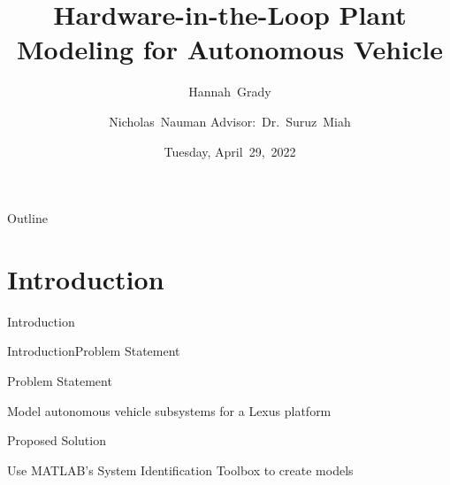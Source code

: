 \documentclass{beamer}
\title[HIL Plant Modeling]{Hardware-in-the-Loop Plant Modeling for Autonomous Vehicle}
\author[H.~Grady, N.~Nauman]{Hannah~Grady \and Nicholas~Nauman 
\linebreak Advisor:~Dr.~Suruz~Miah}
\institute[Bradley University] %
{
  Department of Electrical and Computer Engineering\\
  Bradley University\\
  1501 W. Bradley Avenue\\
  Peoria, IL, 61625, USA
}
\date[April~29,~2022]{Tuesday, April~29,~2022}
\begin{document}
\begin{frame}
  \titlepage
\end{frame}

\begin{frame}{Outline} 
  \tableofcontents%
\end{frame}

\section{Introduction}

\begin{frame}{Introduction}{}

\end{frame}

\begin{frame}{Introduction}{Problem Statement}
  \begin{block}{Problem Statement}
    \begin{Large}
    		Model autonomous vehicle subsystems for a Lexus platform
    \end{Large}
  \end{block}
  \pause
  \begin{block}{Proposed Solution}
    \begin{Large}
    		Use MATLAB's System Identification Toolbox to create models
    \end{Large}
  \end{block}
\end{frame}




%
%
\end{document}
